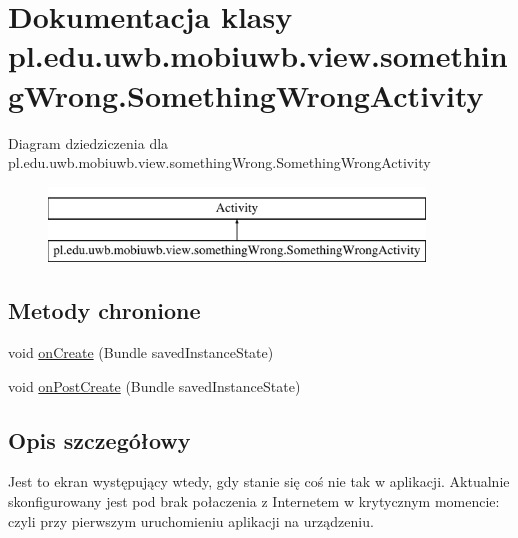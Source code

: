 \hypertarget{classpl_1_1edu_1_1uwb_1_1mobiuwb_1_1view_1_1something_wrong_1_1_something_wrong_activity}{}\section{Dokumentacja klasy pl.\+edu.\+uwb.\+mobiuwb.\+view.\+something\+Wrong.\+Something\+Wrong\+Activity}
\label{classpl_1_1edu_1_1uwb_1_1mobiuwb_1_1view_1_1something_wrong_1_1_something_wrong_activity}
Diagram dziedziczenia dla pl.\+edu.\+uwb.\+mobiuwb.\+view.\+something\+Wrong.\+Something\+Wrong\+Activity\begin{figure}[H]
\begin{center}
\leavevmode
\includegraphics[height=2.000000cm]{classpl_1_1edu_1_1uwb_1_1mobiuwb_1_1view_1_1something_wrong_1_1_something_wrong_activity}
\end{center}
\end{figure}
\subsection*{Metody chronione}
\begin{DoxyCompactItemize}
\item 
void \hyperlink{classpl_1_1edu_1_1uwb_1_1mobiuwb_1_1view_1_1something_wrong_1_1_something_wrong_activity_adec3fababa887f24ad611983eae8d24f}{on\+Create} (Bundle saved\+Instance\+State)
\item 
void \hyperlink{classpl_1_1edu_1_1uwb_1_1mobiuwb_1_1view_1_1something_wrong_1_1_something_wrong_activity_aa9671ce3592484ec4207a5adbdd8a3f4}{on\+Post\+Create} (Bundle saved\+Instance\+State)
\end{DoxyCompactItemize}


\subsection{Opis szczegółowy}
Jest to ekran występujący wtedy, gdy stanie się coś nie tak w aplikacji. Aktualnie skonfigurowany jest pod brak połaczenia z Internetem w krytycznym momencie\+: czyli przy pierwszym uruchomieniu aplikacji na urządzeniu. 

